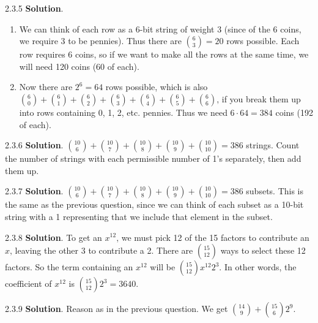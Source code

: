\documentclass[11pt,]{book}
\theoremstyle{ptxplainnotitle}
\theoremstyle{ptxplaintitle}
\theoremstyle{ptxdefinitionnotitle}
\theoremstyle{ptxdefinitiontitle}
\theoremstyle{ptxdefinitionnotitle}
\theoremstyle{ptxdefinitiontitle}
\theoremstyle{ptxdefinitionnotitle}
\theoremstyle{ptxdefinitiontitle}
\theoremstyle{ptxdefinitiontitlenonumber}
\theoremstyle{ptxdefinitiontitlenonumber}
\numberwithin{equation}{chapter}
\begin{document}
\begin{divisionexercise}{2.3.5}
\textbf{Solution}.\quad%
\hypertarget{p-1335}{}%
\leavevmode%
\begin{enumerate}[label=\alph*.]
\item\hypertarget{li-589}{}\hypertarget{p-1336}{}%
We can think of each row as a 6-bit string of weight 3 (since of the 6 coins, we require 3 to be pennies).  Thus there are \({6 \choose 3} = 20\) rows possible.  Each row requires 6 coins, so if we want to make all the rows at the same time, we will need 120 coins (60 of each).%
\item\hypertarget{li-590}{}\hypertarget{p-1337}{}%
Now there are \(2^6 = 64\) rows possible, which is also \({6 \choose 0} + {6\choose 1} + {6 \choose 2} + {6 \choose 3} + {6 \choose 4} + {6 \choose 5} + {6 \choose 6}\text{,}\) if you break them up into rows containing 0, 1, 2, etc. pennies.  Thus we need \(6 \cdot 64 = 384\) coins (192 of each).%
\end{enumerate}
%
\end{divisionexercise}%
\begin{divisionexercise}{2.3.6}
\textbf{Solution}.\quad%
\hypertarget{p-1343}{}%
\({10 \choose 6} + {10\choose 7} + {10\choose 8} + {10 \choose 9} + {10\choose 10} = 386\) strings.  Count the number of strings with each permissible number of 1's separately, then add them up.%
\end{divisionexercise}%
\begin{divisionexercise}{2.3.7}
\textbf{Solution}.\quad%
\hypertarget{p-1350}{}%
\({10 \choose 6} + {10\choose 7} + {10\choose 8} + {10 \choose 9} + {10\choose 10} = 386\) subsets. This is the same as the previous question, since we can think of each subset as a 10-bit string with a 1 representing that we include that element in the subset.%
\end{divisionexercise}%
\begin{divisionexercise}{2.3.8}
\textbf{Solution}.\quad%
\hypertarget{p-1356}{}%
To get an \(x^{12}\text{,}\) we must pick 12 of the 15 factors to contribute an \(x\text{,}\) leaving the other 3 to contribute a 2. There are \({15 \choose 12}\) ways to select these 12 factors. So the term containing an \(x^{12}\) will be \({15 \choose 12}x^{12}2^{3}\text{.}\) In other words, the coefficient of \(x^{12}\) is \({15\choose 12}2^3 = 3640\text{.}\)%
\end{divisionexercise}%
\begin{divisionexercise}{2.3.9}
\textbf{Solution}.\quad%
\hypertarget{p-1361}{}%
Reason as in the previous question. We get \({14\choose 9} + {15 \choose 6}2^9\text{.}\)%
\end{divisionexercise}%
\end{document}
